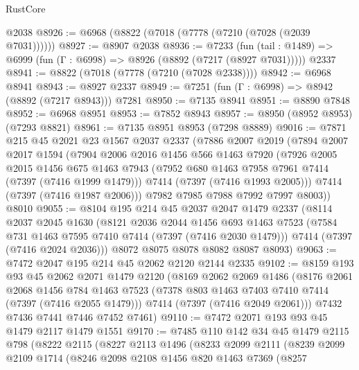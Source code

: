 \begin{lexlean}{RustCore}
\begin{coremodule}
    @2038
@8926 := @6968 (@8822 (@7018 (@7778 (@7210 (@7028 (@2039 @7031))))))
@8927 := @8907 @2038
@8936 := @7233
    (fun (tail : @1489) => @6999 (fun (Γ : @6998) => @8926 (@8892 (@7217 (@8927 @7031)))))
    @2337
@8941 := @8822 (@7018 (@7778 (@7210 (@7028 @2338))))
@8942 := @6968 @8941
@8943 := @8927 @2337
@8949 := @7251 (fun (Γ : @6998) => @8942 (@8892 (@7217 @8943))) @7281
@8950 := @7135 @8941
@8951 := @8890 @7848
@8952 := @6968 @8951
@8953 := @7852 @8943
@8957 := @8950 (@8952 @8953) (@7293 @8821)
@8961 := @7135 @8951 @8953 (@7298 @8889)
@9016 := @7871
    @215
    @45
    @2021
    @23
    @1567
    @2037
    @2337
    (@7886
      @2007
      @2019
      (@7894
        @2007
        @2017
        @1594
        (@7904
          @2006
          @2016
          @1456
          @566
          @1463
          @7920
          (@7926
            @2005
            @2015
            @1456
            @675
            @1463
            @7943
            (@7952 @680 @1463 @7958 @7961 @7414 (@7397 (@7416 @1999 @1479)))
            @7414
            (@7397 (@7416 @1993 @2005)))
          @7414
          (@7397 (@7416 @1987 @2006)))
        @7982
        @7985
        @7988
        @7992
        @7997
        @8003))
    @8010
@9055 := @8104
    @195
    @214
    @45
    @2037
    @2047
    @1479
    @2337
    (@8114
      @2037
      @2045
      @1630
      (@8121
        @2036
        @2044
        @1456
        @693
        @1463
        @7523
        (@7584 @731 @1463 @7595 @7410 @7414 (@7397 (@7416 @2030 @1479)))
        @7414
        (@7397 (@7416 @2024 @2036)))
      @8072
      @8075
      @8078
      @8082
      @8087
      @8093)
@9063 := @7472 @2047 @195 @214 @45 @2062 @2120 @2144 @2335
@9102 := @8159
    @193
    @93
    @45
    @2062
    @2071
    @1479
    @2120
    (@8169
      @2062
      @2069
      @1486
      (@8176
        @2061
        @2068
        @1456
        @784
        @1463
        @7523
        (@7378 @803 @1463 @7403 @7410 @7414 (@7397 (@7416 @2055 @1479)))
        @7414
        (@7397 (@7416 @2049 @2061)))
      @7432
      @7436
      @7441
      @7446
      @7452
      @7461)
@9110 := @7472 @2071 @193 @93 @45 @1479 @2117 @1479 @1551
@9170 := @7485
    @110
    @142
    @34
    @45
    @1479
    @2115
    @798
    (@8222
      @2115
      (@8227
        @2113
        @1496
        (@8233
          @2099
          @2111
          (@8239
            @2099
            @2109
            @1714
            (@8246
              @2098
              @2108
              @1456
              @820
              @1463
              @7369
              (@8257

\end{coremodule}
\end{lexlean}
